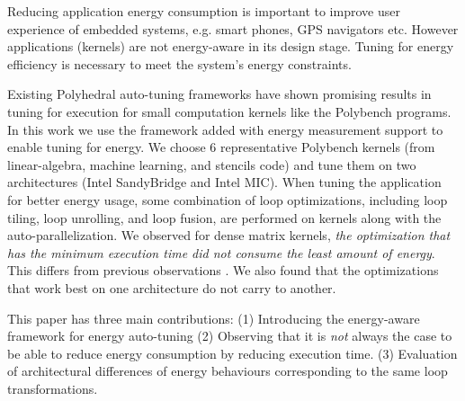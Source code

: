 Reducing application energy consumption is important to improve user experience of 
embedded systems, e.g. smart phones, GPS navigators etc.  
However applications (kernels) are not energy-aware in its design stage. Tuning
for energy efficiency is necessary to meet the system's energy constraints.

Existing Polyhedral auto-tuning frameworks have shown promising results in tuning for execution
for small computation kernels like the Polybench programs\cite{EJ2012}. 
In this work we use the framework added with energy measurement support to enable tuning for energy.
We choose 6 representative Polybench kernels (from linear-algebra, machine learning, and stencils code) 
and tune them on two architectures (Intel SandyBridge and Intel MIC).
When tuning the application for better energy usage, some combination of loop optimizations, including loop 
tiling, loop unrolling, and loop fusion, are performed on kernels along with the auto-parallelization.
We observed for dense matrix kernels, \emph{the optimization that has the minimum execution time 
did not consume the least amount of energy}. This differs from previous observations \cite{Wang2014}.
We also found that the optimizations that work best on one architecture do not carry to another.  
 
This paper has three main contributions: 
(1) Introducing the energy-aware framework for energy auto-tuning
(2) Observing that it is \emph{not} always the case to be able to reduce energy consumption by reducing execution time.
(3) Evaluation of architectural differences of energy behaviours corresponding to the same loop transformations.

%
